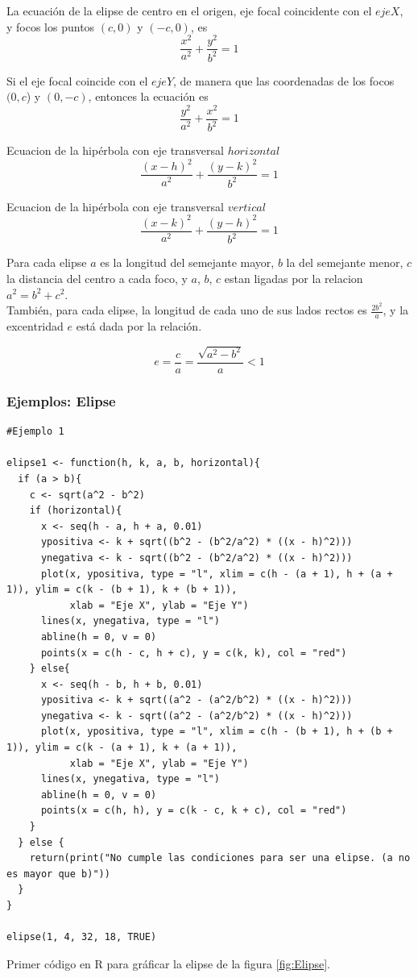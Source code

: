 \documentclass[12pt,a4paper]{article} %
\begin{document}
La ecuación de la elipse de centro en el origen, eje focal coincidente con el $eje X$, y focos los puntos $(c,0)$ y $(-c,0)$, es
$$ {\frac{x^2}{a^2} + \frac{y^2}{b^2} = 1} $$

Si el eje focal coincide con el $eje Y$, de manera que las coordenadas de los focos $(0,c$) y $(0,-c)$, entonces la ecuación es 
$$ {\frac{y^2}{a^2} + \frac{x^2}{b^2} = 1} $$

Ecuacion de la hipérbola con eje transversal $horizontal$
$$ {\frac{(x - h)^2}{a^2} + \frac{(y - k)^2}{b^2} = 1} $$

Ecuacion de la hipérbola con eje transversal $vertical$
$$ {\frac{(x - k)^2}{a^2} + \frac{(y - h)^2}{b^2} = 1} $$

Para cada elipse $a$ es la longitud del semejante mayor, $b$ la del semejante menor, $c$ la distancia del centro a cada foco, y $a$, $b$, $c$ estan ligadas por la relacion $a^2 = b^2 + c^2$.
\\También, para cada elipse, la longitud de cada uno de sus lados rectos es $\frac{2b^2}{a}$, y la excentridad $e$ está dada por la relación.

$$e = \frac{c}{a} = \frac{\sqrt{a^2 - b^2}}{a} < 1$$

\subsubsection{Ejemplos: Elipse}

\begin{table}[htpb]
	\begin{lstlisting}
#Ejemplo 1

elipse1 <- function(h, k, a, b, horizontal){
  if (a > b){ 
    c <- sqrt(a^2 - b^2) 
    if (horizontal){
      x <- seq(h - a, h + a, 0.01) 
      ypositiva <- k + sqrt((b^2 - (b^2/a^2) * ((x - h)^2))) 
      ynegativa <- k - sqrt((b^2 - (b^2/a^2) * ((x - h)^2))) 
      plot(x, ypositiva, type = "l", xlim = c(h - (a + 1), h + (a + 1)), ylim = c(k - (b + 1), k + (b + 1)),
           xlab = "Eje X", ylab = "Eje Y")
      lines(x, ynegativa, type = "l") 
      abline(h = 0, v = 0) 
      points(x = c(h - c, h + c), y = c(k, k), col = "red") 
    } else{
      x <- seq(h - b, h + b, 0.01)
      ypositiva <- k + sqrt((a^2 - (a^2/b^2) * ((x - h)^2)))
      ynegativa <- k - sqrt((a^2 - (a^2/b^2) * ((x - h)^2)))
      plot(x, ypositiva, type = "l", xlim = c(h - (b + 1), h + (b + 1)), ylim = c(k - (a + 1), k + (a + 1)),
           xlab = "Eje X", ylab = "Eje Y")
      lines(x, ynegativa, type = "l")
      abline(h = 0, v = 0)
      points(x = c(h, h), y = c(k - c, k + c), col = "red")
    }
  } else {
    return(print("No cumple las condiciones para ser una elipse. (a no es mayor que b)"))
  }
}

elipse(1, 4, 32, 18, TRUE)

	\end{lstlisting}
	\caption{Primer código en R para gráficar la elipse de la figura \ref{fig:Elipse}.}
\label{alg:Elipse}	
\end{table}
\end{document}

